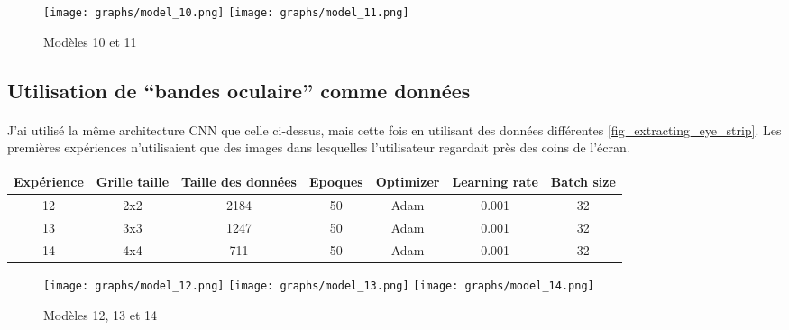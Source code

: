 
\begin{figure}[H]
    \centering
    \texttt{[image: graphs/model\_10.png]}
    \texttt{[image: graphs/model\_11.png]}
    \caption{Modèles 10 et 11}
\end{figure}

\subsection{Utilisation de ``bandes oculaire'' comme données}
\paragraph{}
J'ai utilisé la même architecture CNN que celle ci-dessus, mais cette fois en utilisant des données différentes \ref{fig_extracting_eye_strip}.
Les premières expériences n'utilisaient que des images dans lesquelles l'utilisateur regardait près des coins de l'écran.

\begin{center}
    \begin{tabular}{ c | c | c | c | c | c | c }
        \hline
        Expérience & Grille taille & Taille des données & Epoques & Optimizer & Learning rate & Batch size \\ 
        \hline
        12 & 2x2 & 2184 & 50 & Adam & 0.001 & 32 \\
        \hline
        13 & 3x3 & 1247 & 50 & Adam & 0.001 & 32 \\
        \hline
        14 & 4x4 & 711 & 50 & Adam & 0.001 & 32 \\
        \hline
    \end{tabular}
\end{center}

\begin{figure}[H]
    \centering
    \texttt{[image: graphs/model\_12.png]}
    \texttt{[image: graphs/model\_13.png]}
    \texttt{[image: graphs/model\_14.png]}
    \caption{Modèles 12, 13 et 14}
\end{figure}

